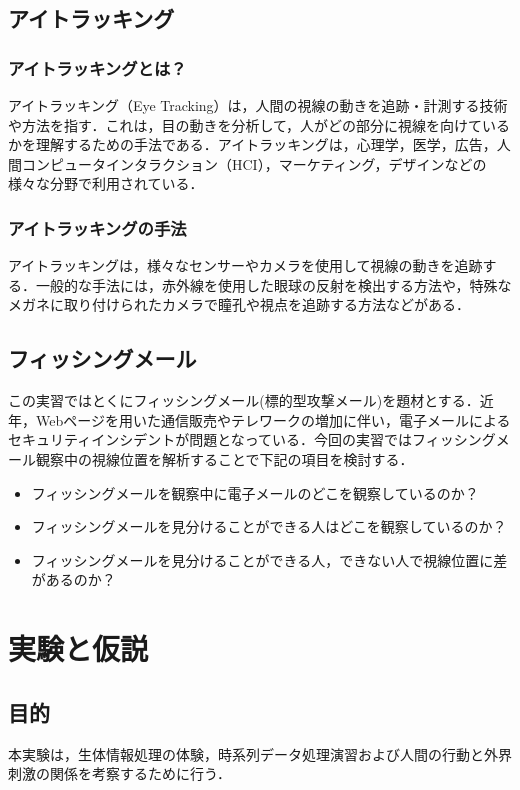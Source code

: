 \documentclass[a4paper,11pt]{ltjsreport}
\begin{document}
\section{アイトラッキング}
\subsection{アイトラッキングとは？}
アイトラッキング（Eye Tracking）は，人間の視線の動きを追跡・計測する技術や方法を指す．これは，目の動きを分析して，人がどの部分に視線を向けているかを理解するための手法である．アイトラッキングは，心理学，医学，広告，人間コンピュータインタラクション（HCI），マーケティング，デザインなどの様々な分野で利用されている．

\subsection{アイトラッキングの手法}
アイトラッキングは，様々なセンサーやカメラを使用して視線の動きを追跡する．一般的な手法には，赤外線を使用した眼球の反射を検出する方法や，特殊なメガネに取り付けられたカメラで瞳孔や視点を追跡する方法などがある．

\section{フィッシングメール}
この実習ではとくにフィッシングメール(標的型攻撃メール)を題材とする．近年，Webページを用いた通信販売やテレワークの増加に伴い，電子メールによるセキュリティインシデントが問題となっている．今回の実習ではフィッシングメール観察中の視線位置を解析することで下記の項目を検討する．\cite{jikkensho}

\begin{itemize}
	\item フィッシングメールを観察中に電子メールのどこを観察しているのか？
	\item フィッシングメールを見分けることができる人はどこを観察しているのか？
	\item フィッシングメールを見分けることができる人，できない人で視線位置に差があるのか？
\end{itemize}


\chapter{実験と仮説}
\section{目的}
本実験は，生体情報処理の体験，時系列データ処理演習および人間の行動と外界刺激の関係を考察するために行う．\cite{ukaji}
\end{document}
